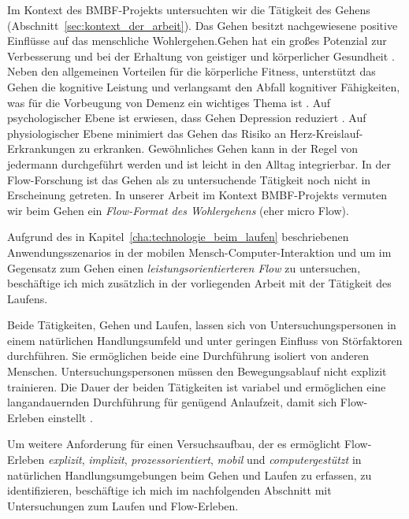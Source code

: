 

Im Kontext des \acs{BMBF}-Projekts untersuchten wir die Tätigkeit des Gehens (Abschnitt~\ref{sec:kontext_der_arbeit}). Das Gehen besitzt nachgewiesene positive Einflüsse auf das menschliche Wohlergehen.Gehen hat ein großes Potenzial zur Verbesserung und bei der Erhaltung von geistiger und körperlicher Gesundheit \citep{Lee2008, Morris1997}. Neben den allgemeinen Vorteilen für die körperliche Fitness, unterstützt das Gehen die kognitive Leistung und verlangsamt den Abfall kognitiver Fähigkeiten, was für die Vorbeugung von Demenz ein wichtiges Thema ist \citep{Weuve2004}. Auf psychologischer Ebene ist erwiesen, dass Gehen Depression reduziert \citep{Robertson2012}. Auf physiologischer Ebene minimiert das Gehen das Risiko an Herz-Kreislauf-Erkrankungen zu erkranken. Gewöhnliches Gehen kann in der Regel von jedermann durchgeführt werden und ist leicht in den Alltag integrierbar. In der Flow-Forschung ist das Gehen als zu untersuchende Tätigkeit noch nicht in Erscheinung getreten. In unserer Arbeit im Kontext \acs{BMBF}-Projekts vermuten wir beim Gehen ein \emph{Flow-Format des Wohlergehens} (eher micro Flow). 

Aufgrund des in Kapitel~\ref{cha:technologie_beim_laufen} beschriebenen Anwendungsszenarios in der mobilen Mensch-Computer-Interaktion und um im Gegensatz zum Gehen einen \emph{leistungsorientierteren Flow} zu untersuchen, beschäftige ich mich zusätzlich in der vorliegenden Arbeit mit der Tätigkeit des Laufens. 

Beide Tätigkeiten, Gehen und Laufen, lassen sich von Untersuchungspersonen in einem natürlichen Handlungsumfeld und unter geringen Einfluss von Störfaktoren durchführen. Sie ermöglichen beide eine Durchführung isoliert von anderen Menschen. Untersuchungspersonen müssen den Bewegungsablauf nicht explizit trainieren. Die Dauer der beiden Tätigkeiten ist variabel und ermöglichen eine langandauernden Durchführung für genügend Anlaufzeit, damit sich Flow-Erleben einstellt \citep[S.~109]{Henk2014}.

Um weitere Anforderung für einen Versuchsaufbau, der es ermöglicht Flow-Erleben \emph{explizit}, \emph{implizit}, \emph{prozessorientiert}, \emph{mobil} und \emph{computergestützt} in natürlichen Handlungsumgebungen beim Gehen und Laufen zu erfassen, zu identifizieren, beschäftige ich mich im nachfolgenden Abschnitt mit Untersuchungen zum Laufen und Flow-Erleben. 
